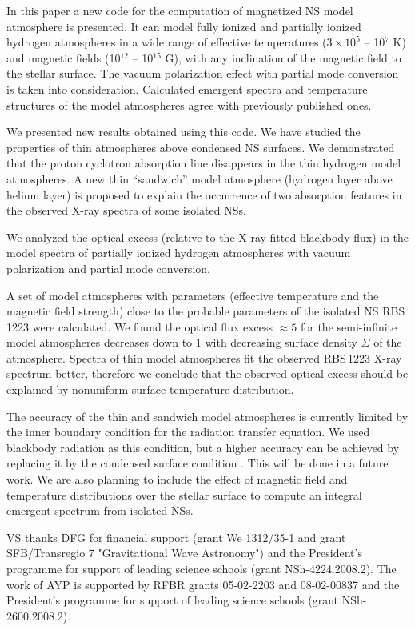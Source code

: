 \documentclass{aa}
\begin{document}
In this paper a new code for the computation of magnetized 
NS model atmosphere is presented. It can model fully ionized 
 and  partially ionized hydrogen atmospheres in a wide range 
of effective temperatures ($3 \times 10^5$ -- 10$^7$ K) and magnetic 
fields (10$^{12}$ -- 10$^{15}$ G), with any inclination 
of the magnetic 
field to the stellar surface.  The vacuum polarization effect with 
partial mode conversion is taken into consideration. Calculated 
emergent spectra and temperature structures of the model 
atmospheres agree with previously published ones. 
 
We presented new results  obtained using this code. 
We have studied the 
properties of  thin atmospheres above condensed NS surfaces. We 
demonstrated that the proton cyclotron absorption line disappears in the 
thin hydrogen model atmospheres. A new thin ``sandwich'' model atmosphere 
(hydrogen layer above helium layer)  is proposed to explain the occurrence 
of two absorption features in the observed X-ray spectra of some isolated NSs. 

 We analyzed the optical excess (relative to
the X-ray fitted blackbody flux) in the model spectra of
partially ionized hydrogen atmospheres with vacuum polarization
and partial mode conversion. 

A set of model atmospheres  with  parameters  (effective 
temperature and the magnetic field strength) close to the probable parameters 
of the isolated NS RBS\,1223  were calculated. 
We found the optical flux excess $\approx 5$ for the semi-infinite model 
atmospheres decreases down to 1 with decreasing surface density $\Sigma$ 
of the atmosphere. Spectra of thin model atmospheres fit the observed 
RBS\,1223 X-ray spectrum better, therefore we conclude that the observed optical 
excess should be explained by nonuniform surface temperature 
distribution. 
 
The accuracy of the thin and sandwich 
model atmospheres is currently limited  by the inner 
boundary condition for the radiation transfer equation. We used blackbody 
radiation as this condition, but a higher accuracy can be 
achieved 
by replacing it by the condensed surface condition 
\citep{vAetal:05}. 
This will be done in a future work. 
We are also planning to include the effect 
of magnetic field and temperature distributions over the stellar surface
to compute an integral emergent spectrum  from isolated NSs. 
 
\begin{acknowledgements} 
 
VS thanks DFG for financial support (grant We 1312/35-1 and grant 
SFB/Transregio 7 "Gravitational Wave Astronomy") and the President's 
programme for support of leading science schools (grant NSh-4224.2008.2). 
The work of AYP is supported by RFBR grants 05-02-2203 and 08-02-00837 
 and the President's 
programme for support of leading science schools (grant NSh-2600.2008.2). 
 
\end{acknowledgements} 
 
\end{document}
